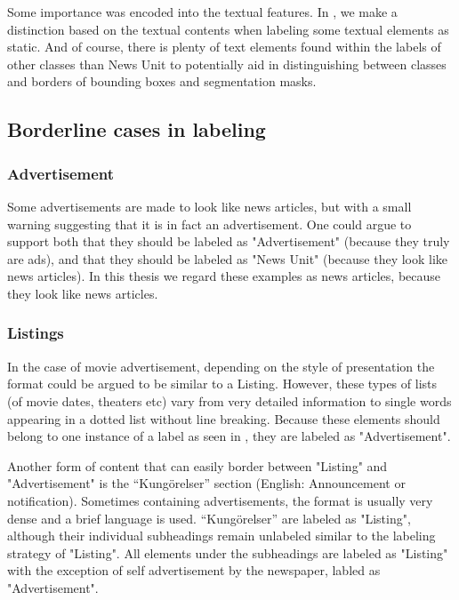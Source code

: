 \documentclass[oneside, english, bibtex]{kththesis}
\begin{document}
Some importance was encoded into the textual features. In , we make a distinction based on the textual contents when labeling some textual elements as static. And of course, there is plenty of text elements found within the labels of other classes than News Unit to potentially aid in distinguishing between classes and borders of bounding boxes and segmentation masks. 

\subsection{Borderline cases in labeling}

\subsubsection{Advertisement}
\label{subsub:ads}

Some advertisements are made to look like news articles, but with a small warning suggesting that it is in fact an advertisement. One could argue to support both that they should be labeled
as "Advertisement" (because they truly are ads), and that they should be labeled as "News Unit" (because they look like news articles). In this thesis we regard these examples as news articles, because they look like news articles. 

\subsubsection{Listings}
\label{subsub:listings}

In the case of movie advertisement, depending on the style of presentation the format could be argued to be similar to a Listing.
However, these types of lists (of movie dates, theaters etc) vary from very detailed information to single words appearing in a dotted list without line breaking.
Because these elements should belong to one instance of a label as seen in , they are labeled as "Advertisement".

Another form of content that can easily border between "Listing" and "Advertisement" is the “Kungörelser” section (English: Announcement or notification).
Sometimes containing advertisements, the format is usually very dense and a brief language is used.
“Kungörelser” are labeled as "Listing",
although their individual subheadings remain unlabeled similar to the labeling strategy of "Listing". All elements under the subheadings are labeled as "Listing" with the exception of self advertisement by the newspaper, labled as "Advertisement".
\end{document}
